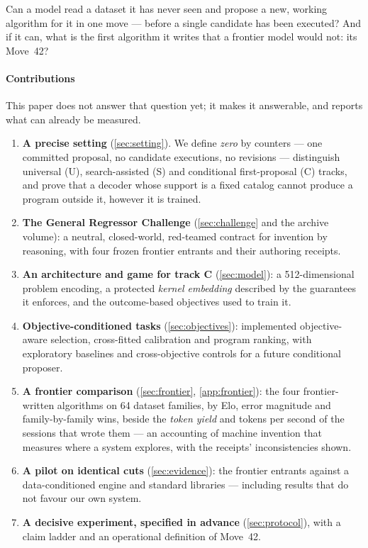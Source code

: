 \begin{izquestion}
Can a model read a dataset it has never seen and propose a new, working algorithm for it in one
move --- before a single candidate has been executed? And if it can, what is the first algorithm it
writes that a frontier model would not: its Move~42?
\end{izquestion}

\paragraph{Contributions} This paper does not answer that question yet; it makes it answerable, and
reports what can already be measured.
\begin{enumerate}
\item \textbf{A precise setting} (\cref{sec:setting}). We define \emph{zero} by counters --- one
committed proposal, no candidate executions, no revisions --- distinguish universal (U),
search-assisted (S) and conditional first-proposal (C) tracks, and prove that a decoder whose
support is a fixed catalog cannot produce a program outside it, however it is trained.
\item \textbf{The General Regressor Challenge} (\cref{sec:challenge} and the archive volume): a
neutral, closed-world, red-teamed contract for invention by reasoning, with four frozen frontier
entrants and their authoring receipts.
\item \textbf{An architecture and game for track C} (\cref{sec:model}): a 512-dimensional problem
encoding, a protected \emph{kernel embedding} described by the guarantees it enforces, and the
outcome-based objectives used to train it.
\item \textbf{Objective-conditioned tasks} (\cref{sec:objectives}): implemented objective-aware
selection, cross-fitted calibration and program ranking, with exploratory baselines and
cross-objective controls for a future conditional proposer.
\item \textbf{A frontier comparison} (\cref{sec:frontier}, \cref{app:frontier}): the four
frontier-written algorithms on 64 dataset families, by Elo, error magnitude and family-by-family
wins, beside the \emph{token yield} and tokens per second of the sessions that wrote them --- an
accounting of machine invention that measures where a system explores, with the receipts'
inconsistencies shown.
\item \textbf{A pilot on identical cuts} (\cref{sec:evidence}): the frontier entrants against a
data-conditioned engine and standard libraries --- including results that do not favour our own
system.
\item \textbf{A decisive experiment, specified in advance} (\cref{sec:protocol}), with a claim
ladder and an operational definition of Move~42.
\end{enumerate}
